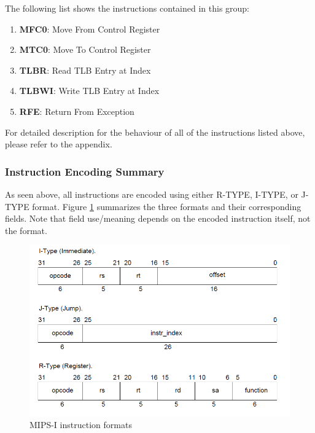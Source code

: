\documentclass[oneside]{book}
\begin{document}
The following list shows the instructions contained in this group:

\begin{enumerate}

\item \textbf{MFC0}:  Move From Control Register
\item \textbf{MTC0}:  Move To Control Register
\item \textbf{TLBR}:  Read TLB Entry at Index
\item \textbf{TLBWI}: Write TLB Entry at Index
\item \textbf{RFE}:   Return From Exception

\end{enumerate}

For detailed description for the behaviour of all of the instructions listed
above, please refer to the appendix.

\subsubsection{Instruction Encoding Summary}

As seen above, all instructions are encoded using either R-TYPE, I-TYPE,
or J-TYPE format. Figure \ref{formats} summarizes the three formats and their
corresponding fields. Note that field use/meaning depends on the
encoded instruction itself, not the format.\\

\begin{figure}[H]
\begin{center}
\includegraphics[width=\textwidth]{formats.png}
\end{center}
\caption{MIPS-I instruction formats}
\label{formats}
\end{figure}
\end{document}
